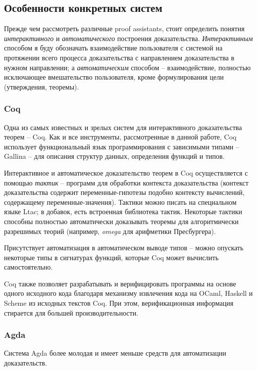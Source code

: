 \documentclass[aps,12pt,final,oneside,onecolumn,musixtex,superscriptaddress,centertags]{article}
\begin{document}
  \newpage
  \subsection{Особенности конкретных систем}
     Прежде чем рассмотреть различные proof assistants, стоит определить понятия \emph{интерактивного} и \emph{автоматического} построения доказательства. \emph{Интерактивным} способом я буду обозначать взаимодействие пользователя с системой на протяжении всего процесса доказательства с направлением доказательства в нужном направлении; а \emph{автоматическим} способом -- взаимодействие, полностью исключающее вмешательство пользователя, кроме формулирования цели (утверждения, теоремы).

  \subsubsection{Coq}
     Одна из самых известных и зрелых систем для интерактивного доказательства теорем -- Coq. Как и все инструменты, рассмотренные в данной работе, Coq использует функциональный язык программирования с зависимыми типами -- Gallina -- для описания структур данных, определения функций и типов.

     Интерактивное и автоматическое доказательство теорем в Coq осуществляется с помощью \emph{тактик} -- программ для обработки контекста доказательства (контекст доказательства содержит переменные-гипотезы подобно контексту вычислений, содержащему переменные-значения). Тактики можно писать на специальном языке Ltac; в добавок, есть встроенная библиотека тактик. Некоторые тактики способны полностью автоматически доказывать теоремы для алгоритмически разрешимых теорий (например, \emph{omega} для арифметики Пресбургера).

     Присутствует автоматизация в автоматическом выводе типов -- можно опускать некоторые типы в сигнатурах функций, которые Coq может вычислить самостоятельно.

     Coq также позволяет разрабатывать и верифицировать программы на основе одного исходного кода благодаря механизму извлечения кода на OCaml, Haskell и Scheme из исходных текстов Coq. При этом, верификационная информация стирается для большей производительности.

  \newpage
  \subsubsection{Agda}
     Система Agda более молодая и имеет меньше средств для автоматизации доказательств.
\end{document}
